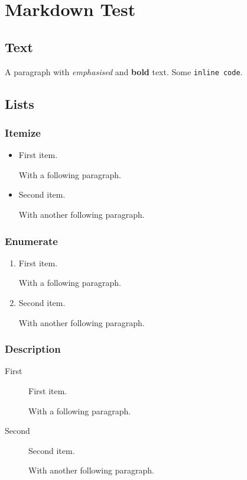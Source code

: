 \documentclass[
  text,
  markdown={section level=3},
]{internet}
\begin{document}
\section{Markdown Test}

\subsection{Text}

A paragraph with \emph{emphasised} and \textbf{bold} text.
Some \verb+inline code+.

\subsection{Lists}

\subsubsection{Itemize}

\begin{itemize}
\item First item.

With a following paragraph.

\item Second item.

With another following paragraph.
\end{itemize}

\subsubsection{Enumerate}

\begin{enumerate}
\item First item.

With a following paragraph.

\item Second item.

With another following paragraph.
\end{enumerate}

\subsubsection{Description}

\begin{description}
\item[First] First item.

With a following paragraph.

\item[Second] Second item.

With another following paragraph.
\end{description}
\end{document}
